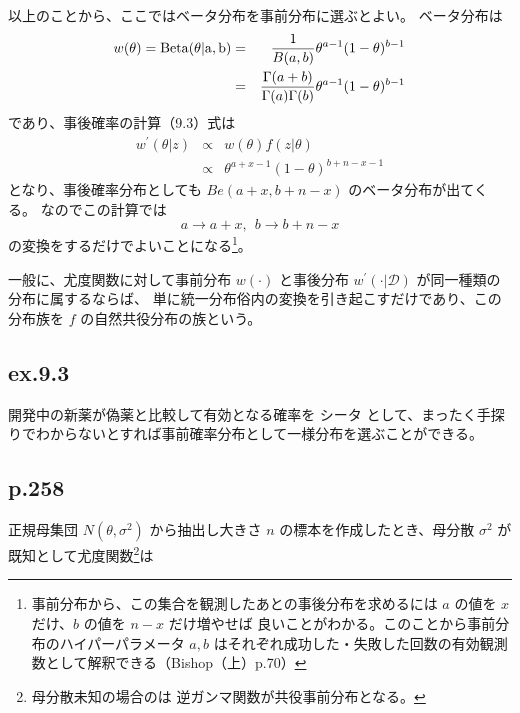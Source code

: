 \documentclass[10pt, a4paper]{ltjsarticle}
\begin{document}
以上のことから、ここではベータ分布を事前分布に選ぶとよい。
ベータ分布は
\begin{eqnarray}
  w(\theta) = \rm{Beta}(\theta|a,b) &=& 
  \frac{1}{B(a,b)} \theta^{a-1}(1-\theta)^{b-1} \\ 
 &=& \frac{\Gamma(a+b)}{\Gamma(a)\Gamma(b)}\theta^{a-1}(1-\theta)^{b-1}
\end{eqnarray}
であり、事後確率の計算（9.3）式は
\begin{eqnarray}
  w^\prime(\theta|z) &\propto& w(\theta) f(z|\theta) \\
  &\propto& \theta^{a+x-1}(1-\theta)^{b+n-x-1}
\end{eqnarray}
となり、事後確率分布としても $Be(a+x, b+n-x)$ のベータ分布が出てくる。
なのでこの計算では
\begin{equation}
  a \to a+x, ~~b\to b+ n-x
\end{equation}
の変換をするだけでよいことになる\footnote{事前分布から、この集合を観測したあとの事後分布を求めるには $a$ の値を $x$ だけ、$b$ の値を $n-x$ だけ増やせば
良いことがわかる。このことから事前分布のハイパーパラメータ $a,b$ はそれぞれ成功した・失敗した回数の有効観測数として解釈できる（Bishop（上）p.70）}。

一般に、尤度関数に対して事前分布 $w(\cdot)$ と事後分布 $w^\prime(\cdot|\mathcal{D})$ が同一種類の分布に属するならば、
単に統一分布俗内の変換を引き起こすだけであり、この分布族を $f$ の自然共役分布の族という。



\subsection{ex.9.3}
開発中の新薬が偽薬と比較して有効となる確率を シータ として、まったく手探りでわからないとすれば事前確率分布として一様分布を選ぶことができる。


\subsection{p.258}

正規母集団 $N(\theta, \sigma^2)$ から抽出し大きさ $n$ の標本を作成したとき、母分散 $\sigma^2$ が既知として尤度関数\footnote{母分散未知の場合のは
逆ガンマ関数が共役事前分布となる。}は
\end{document}
